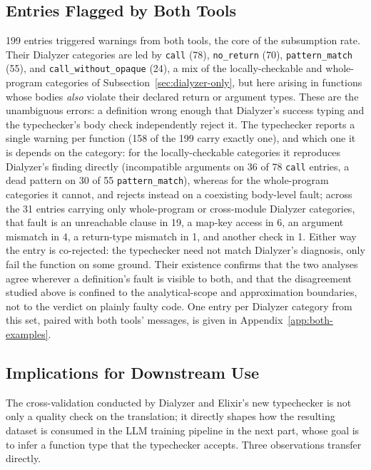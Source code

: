 \subsection{Entries Flagged by Both Tools}
\label{sec:both-warned}

199 entries triggered warnings from both tools, the core of the subsumption rate.
Their Dialyzer categories are led by \texttt{call} (78), \texttt{no\_return} (70), \texttt{pattern\_match} (55), and \texttt{call\_without\_opaque} (24), a mix of the locally-checkable and whole-program categories of Subsection~\ref{sec:dialyzer-only}, but here arising in functions whose bodies \emph{also} violate their declared return or argument types.
These are the unambiguous errors: a definition wrong enough that Dialyzer's success typing and the typechecker's body check independently reject it.
The typechecker reports a single warning per function (158 of the 199 carry exactly one), and which one it is depends on the category: for the locally-checkable categories it reproduces Dialyzer's finding directly (incompatible arguments on 36 of 78 \texttt{call} entries, a dead pattern on 30 of 55 \texttt{pattern\_match}), whereas for the whole-program categories it cannot, and rejects instead on a coexisting body-level fault; across the 31 entries carrying only whole-program or cross-module Dialyzer categories, that fault is an unreachable clause in 19, a map-key access in 6, an argument mismatch in 4, a return-type mismatch in 1, and another check in 1.
Either way the entry is co-rejected: the typechecker need not match Dialyzer's diagnosis, only fail the function on some ground.
Their existence confirms that the two analyses agree wherever a definition's fault is visible to both, and that the disagreement studied above is confined to the analytical-scope and approximation boundaries, not to the verdict on plainly faulty code.
One entry per Dialyzer category from this set, paired with both tools' messages, is given in Appendix~\ref{app:both-examples}.

\subsection{Implications for Downstream Use}
\label{sec:downstream-implications}

The cross-validation conducted by Dialyzer and Elixir's new typechecker is not only a quality check on the translation; it directly shapes how the resulting dataset is consumed in the LLM training pipeline in the next part, whose goal is to infer a function type that the typechecker accepts.
Three observations transfer directly.

